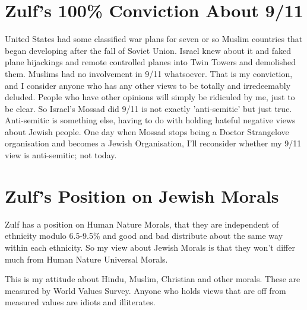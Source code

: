 \documentclass{amsart}
\begin{document}
\section{Zulf's 100\% Conviction About 9/11}

United States had some classified war plans for seven or so Muslim countries that began developing after the fall of Soviet Union.  Israel knew about it and faked plane hijackings and remote controlled planes into Twin Towers and demolished them.  Muslims had no involvement in 9/11 whatsoever.  That is my conviction, and I consider anyone who has any other views to be totally and irredeemably deluded.  People who have other opinions will simply be ridiculed by me, just to be clear.  So Israel's Mossad did 9/11 is not exactly 'anti-semitic' but just true.  Anti-semitic is something else, having to do with holding hateful negative views about Jewish people.  One day when Mossad stops being a Doctor Strangelove organisation and becomes a Jewish Organisation, I'll reconsider whether my 9/11 view is anti-semitic; not today.

\section{Zulf's Position on Jewish Morals}

Zulf has a position on Human Nature Morals, that they are independent of ethnicity modulo 6.5-9.5\% and good and bad distribute about the same way within each ethnicity.  So my view about Jewish Morals is that they won't differ much from Human Nature Universal Morals.

This is my attitude about Hindu, Muslim, Christian and other morals. These are measured by World Values Survey.  Anyone who holds views that are off from measured values are idiots and illiterates.
\end{document}
